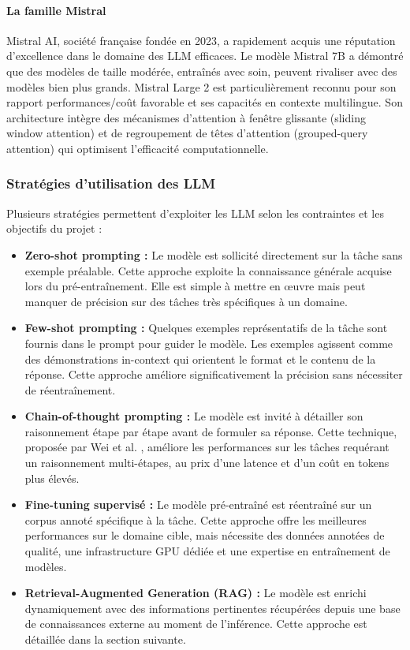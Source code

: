 \paragraph{La famille Mistral}

Mistral AI, société française fondée en 2023, a rapidement acquis une réputation d'excellence dans le domaine des LLM efficaces. Le modèle Mistral 7B \cite{logo:mistral} a démontré que des modèles de taille modérée, entraînés avec soin, peuvent rivaliser avec des modèles bien plus grands. Mistral Large 2 est particulièrement reconnu pour son rapport performances/coût favorable et ses capacités en contexte multilingue. Son architecture intègre des mécanismes d'attention à fenêtre glissante (sliding window attention) et de regroupement de têtes d'attention (grouped-query attention) qui optimisent l'efficacité computationnelle.

\subsubsection{Stratégies d'utilisation des LLM}

Plusieurs stratégies permettent d'exploiter les LLM selon les contraintes et les objectifs du projet :

\begin{itemize}
    \item \textbf{Zero-shot prompting :} Le modèle est sollicité directement sur la tâche sans exemple préalable. Cette approche exploite la connaissance générale acquise lors du pré-entraînement. Elle est simple à mettre en œuvre mais peut manquer de précision sur des tâches très spécifiques à un domaine.

    \item \textbf{Few-shot prompting :} Quelques exemples représentatifs de la tâche sont fournis dans le prompt pour guider le modèle. Les exemples agissent comme des démonstrations in-context qui orientent le format et le contenu de la réponse. Cette approche améliore significativement la précision sans nécessiter de réentraînement.

    \item \textbf{Chain-of-thought prompting :} Le modèle est invité à détailler son raisonnement étape par étape avant de formuler sa réponse. Cette technique, proposée par Wei et al. \cite{logo:cot}, améliore les performances sur les tâches requérant un raisonnement multi-étapes, au prix d'une latence et d'un coût en tokens plus élevés.

    \item \textbf{Fine-tuning supervisé :} Le modèle pré-entraîné est réentraîné sur un corpus annoté spécifique à la tâche. Cette approche offre les meilleures performances sur le domaine cible, mais nécessite des données annotées de qualité, une infrastructure GPU dédiée et une expertise en entraînement de modèles.

    \item \textbf{Retrieval-Augmented Generation (RAG) :} Le modèle est enrichi dynamiquement avec des informations pertinentes récupérées depuis une base de connaissances externe au moment de l'inférence. Cette approche est détaillée dans la section suivante.
\end{itemize}

